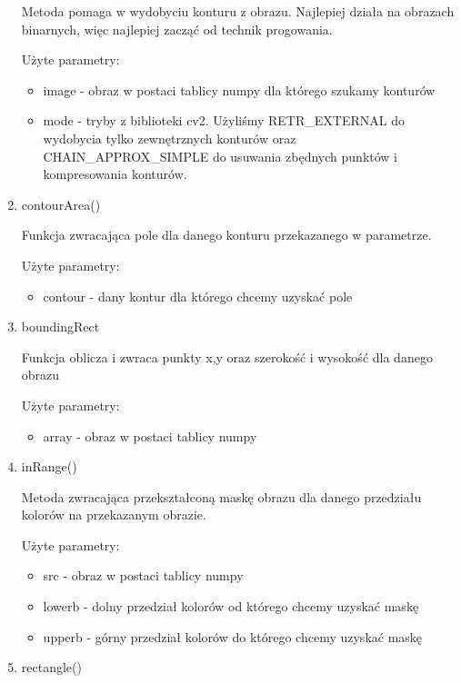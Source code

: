 \documentclass{article}
\begin{document}
\begin{enumerate}
Metoda pomaga w wydobyciu konturu z obrazu. Najlepiej działa na obrazach binarnych, więc najlepiej zacząć od technik progowania.

Użyte parametry:

\begin{itemize}
\item image - obraz w postaci tablicy numpy dla którego szukamy konturów
\item mode - tryby z biblioteki cv2. Użyliśmy RETR\_EXTERNAL  do wydobycia tylko zewnętrznych konturów oraz CHAIN\_APPROX\_SIMPLE do usuwania zbędnych punktów i kompresowania konturów.
\end{itemize}

\item contourArea() \cite{opencv9}

Funkcja zwracająca pole dla danego konturu przekazanego w parametrze.

Użyte parametry:

\begin{itemize}
\item contour - dany kontur dla którego chcemy uzyskać pole
\end{itemize}

\item boundingRect \cite{opencv10}

Funkcja oblicza i zwraca punkty x,y oraz szerokość i wysokość dla danego obrazu

Użyte parametry:

\begin{itemize}
\item array - obraz w postaci tablicy numpy
\end{itemize}

\item inRange() \cite{opencv11}

Metoda zwracająca przekształconą maskę obrazu dla danego przedziału kolorów na przekazanym obrazie.

Użyte parametry:

\begin{itemize}
\item src - obraz w postaci tablicy numpy
\item lowerb - dolny przedział kolorów od którego chcemy uzyskać maskę
\item upperb - górny przedział kolorów do którego chcemy uzyskać maskę
\end{itemize}

\item rectangle() \cite{opencv12}


\end{enumerate}
\end{document}
